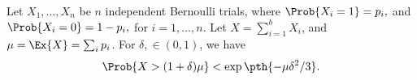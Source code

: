 \begin{lemma}
        Let $X_1, \ldots, X_n$ be $n$ independent Bernoulli trials, where
        \begin{math}
            \Prob{  X_i = 1 } =p_i,
        \end{math}
        and
        \begin{math}
            \Prob{  X_i = 0 } =1- p_i,
        \end{math}
        for $i=1,\ldots, n$.  Let $X = \sum_{i=1}^{b} X_i$, and
        $\mu = \Ex{\bigl. X} = \sum_i p_i$.  For $\delta, \in (0,1)$,
        we have
        \begin{equation*}
            \Prob{ \bigl. X > (1+\delta)\mu } < \exp \pth{-\mu \delta^2 /
               3}.
        \end{equation*}
    \end{lemma}
